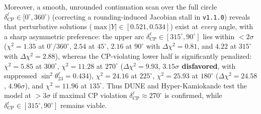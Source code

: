 \documentclass[11pt,a4paper]{article}
\begin{document}
Moreover, a smooth, unrounded continuation scan over the full circle $\delta_{\mathrm{CP}}^\ell \in [0^\circ, 360^\circ)$ (correcting a rounding-induced Jacobian stall in \texttt{v1.1.0}) reveals that perturbative solutions ($\max|Y| \in [0.521, 0.534]$) exist at \emph{every} angle, with a sharp asymmetric preference: the upper arc $\delta_{\mathrm{CP}}^\ell \in [315^\circ, 90^\circ]$ lies within $<2\sigma$ ($\chi^2 = 1.35$ at $0^\circ/360^\circ$, $2.54$ at $45^\circ$, $2.16$ at $90^\circ$ with $\Delta\chi^2 = 0.81$, and $4.22$ at $315^\circ$ with $\Delta\chi^2 = 2.88$), whereas the CP-violating lower half is significantly penalized: $\chi^2 = 5.85$ at $300^\circ$, $\chi^2 = 11.28$ at $270^\circ$ ($\Delta\chi^2 = 9.93$, \textbf{$3.15\sigma$ disfavored}, with suppressed $\sin^2\theta_{23}^\ell = 0.434$), $\chi^2 = 24.16$ at $225^\circ$, $\chi^2 = 25.93$ at $180^\circ$ ($\Delta\chi^2 = 24.58$, $4.96\sigma$), and $\chi^2 = 11.96$ at $135^\circ$. Thus DUNE and Hyper-Kamiokande test the model at $>3\sigma$ if maximal CP violation $\delta_{\mathrm{CP}}^\ell \approx 270^\circ$ is confirmed, while $\delta_{\mathrm{CP}}^\ell \in [315^\circ, 90^\circ]$ remains viable.
\end{document}
